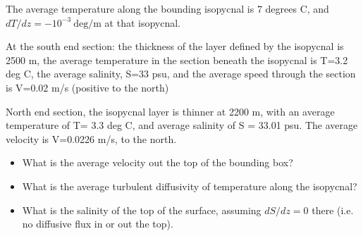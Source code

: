The average temperature along the bounding isopycnal is 7 degrees C, and $dT/dz = -10^{-3}\ \mathrm{deg/m}$ at that isopycnal.

At the south end section: the thickness of the layer defined by the isopycnal is 2500 m, the average temperature in the section beneath the isopycnal is T=3.2 deg C, the average salinity, S=33 psu, and the average speed through the section is V=0.02 m/s (positive to the north)

North end section, the isopycnal layer is thinner at 2200 m, with an average temperature of T= 3.3 deg C, and average salinity of S = 33.01 psu.  The average velocity is V=0.0226 m/s, to the north.

\begin{itemize}
    \item What is the average velocity out the top of the bounding box?
    \item What is the average turbulent diffusivity of temperature along the isopycnal?
    \item What is the salinity of the top of the surface, assuming $dS/dz=0$ there (i.e. no diffusive flux in or out the top).
\end{itemize}




